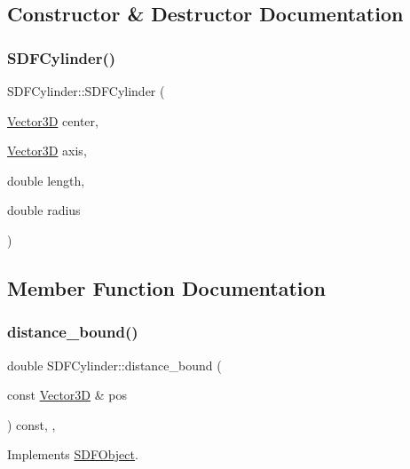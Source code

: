 \subsection{Constructor \& Destructor Documentation}
\mbox{\label{classSDFCylinder_a696d9dfb42e436d07c7777c45c1c973e}} 
\subsubsection{\texorpdfstring{SDFCylinder()}{SDFCylinder()}}
{\footnotesize\ttfamily S\+D\+F\+Cylinder\+::\+S\+D\+F\+Cylinder (\begin{DoxyParamCaption}\item[{\mbox{\hyperlink{classVector3D}{Vector3D}}}]{center,  }\item[{\mbox{\hyperlink{classVector3D}{Vector3D}}}]{axis,  }\item[{double}]{length,  }\item[{double}]{radius }\end{DoxyParamCaption})}



\subsection{Member Function Documentation}
\mbox{\label{classSDFCylinder_a20732b488b83720390197e50ead3883a}} 
\subsubsection{\texorpdfstring{distance\_bound()}{distance\_bound()}}
{\footnotesize\ttfamily double S\+D\+F\+Cylinder\+::distance\+\_\+bound (\begin{DoxyParamCaption}\item[{const \mbox{\hyperlink{classVector3D}{Vector3D}} \&}]{pos }\end{DoxyParamCaption}) const\hspace{0.3cm}{\ttfamily [override]}, {\ttfamily [private]}, {\ttfamily [virtual]}}



Implements \mbox{\hyperlink{classSDFObject_ac34f5232b6ea395178d33e3b084d5a93}{S\+D\+F\+Object}}.

